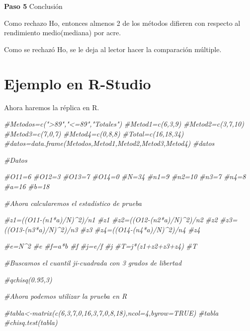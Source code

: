 \documentclass[a4paper,oneside,openany]{book}
\newenvironment{Shaded}{\begin{snugshade}}{\end{snugshade}}
\newcommand{\CommentTok}[1]{\textcolor[rgb]{0.56,0.35,0.01}{\textit{#1}}}
\begin{document}
\textbf{Paso 5} Conclusión

Como rechazo Ho, entonces almenos 2 de los métodos difieren con respecto
al rendimiento medio(mediana) por acre.

Como se rechazó Ho, se le deja al lector hacer la comparación múltiple.

\section{Ejemplo en R-Studio}\label{ejemplo-en-r-studio-12}

Ahora haremos la réplica en R.

\begin{Shaded}
\begin{Highlighting}[]
\CommentTok{#Metodos=c(">89","<=89","Totales")}
\CommentTok{#Metod1=c(6,3,9)}
\CommentTok{#Metod2=c(3,7,10)}
\CommentTok{#Metod3=c(7,0,7)}
\CommentTok{#Metod4=c(0,8,8)}
\CommentTok{#Total=c(16,18,34)}
\CommentTok{#datos=data.frame(Metodos,Metod1,Metod2,Metod3,Metod4)}
\CommentTok{#datos}

\CommentTok{#Datos}

\CommentTok{#O11=6}
\CommentTok{#O12=3}
\CommentTok{#O13=7}
\CommentTok{#O14=0}
\CommentTok{#N=34}
\CommentTok{#n1=9}
\CommentTok{#n2=10}
\CommentTok{#n3=7}
\CommentTok{#n4=8}
\CommentTok{#a=16}
\CommentTok{#b=18}

\CommentTok{#Ahora calcularemos el estadistico de prueba}

\CommentTok{#z1=((O11-(n1*a)/N)^2)/n1}
\CommentTok{#z1}
\CommentTok{#z2=((O12-(n2*a)/N)^2)/n2}
\CommentTok{#z2}
\CommentTok{#z3=((O13-(n3*a)/N)^2)/n3}
\CommentTok{#z3}
\CommentTok{#z4=((O14-(n4*a)/N)^2)/n4}
\CommentTok{#z4}

\CommentTok{#e=N^2}
\CommentTok{#e}
\CommentTok{#f=a*b}
\CommentTok{#f}
\CommentTok{#j=e/f}
\CommentTok{#j}
\CommentTok{#T=j*(z1+z2+z3+z4)}
\CommentTok{#T}

\CommentTok{#Buscamos el cuantil ji-cuadrada con 3 grados de libertad}

\CommentTok{#qchisq(0.95,3)}

\CommentTok{#Ahora podemos utilizar la prueba en R}

\CommentTok{#tabla<-matrix(c(6,3,7,0,16,3,7,0,8,18),ncol=4,byrow=TRUE)}
\CommentTok{#tabla}
\CommentTok{#chisq.test(tabla)}
\end{Highlighting}
\end{Shaded}
\end{document}
